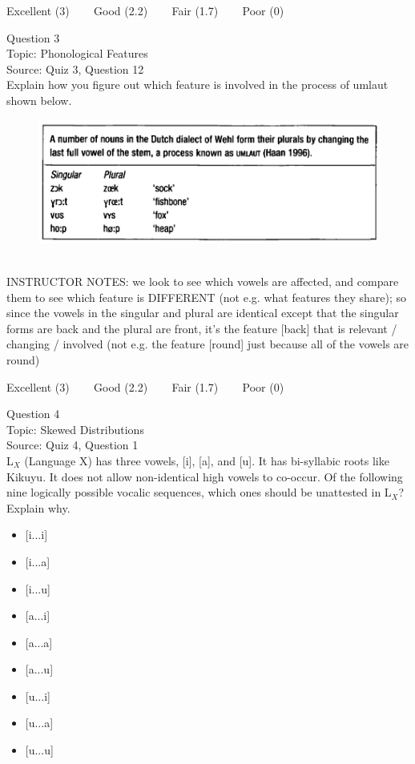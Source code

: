 \documentclass[12pt]{article}
\begin{document}
\vfill
Excellent (3) ~~~ Good (2.2) ~~~ Fair (1.7) ~~~ Poor (0)
\newpage

{\large Question 3}\\

Topic: Phonological Features\\
Source: Quiz 3, Question 12\\

Explain how you figure out which feature is involved in the process of umlaut shown below.\\

\begin{figure}[H]
\includegraphics{../images/dutch.png}
\end{figure}

~\\
INSTRUCTOR NOTES: we look to see which vowels are affected, and compare them to see which feature is DIFFERENT (not e.g. what features they share); so since the vowels in the singular and plural are identical except that the singular forms are back and the plural are front, it's the feature [back] that is relevant / changing / involved (not e.g. the feature [round] just because all of the vowels are round)


\vfill
Excellent (3) ~~~ Good (2.2) ~~~ Fair (1.7) ~~~ Poor (0)
\newpage

{\large Question 4}\\

Topic: Skewed Distributions\\
Source: Quiz 4, Question 1\\

L$_X$ (Language X) has three vowels, [i], [a], and [u]. It has bi-syllabic roots like Kikuyu. It does not allow non-identical high vowels to co-occur. Of the following nine logically possible vocalic sequences, which ones should be unattested in L$_X$? Explain why.\\

\begin{itemize} \item {[i...i]} \item {[i...a]} \item {[i...u]} \item {[a...i]} \item {[a...a]} \item {[a...u]} \item {[u...i]} \item {[u...a]} \item {[u...u]} \end{itemize}
\end{document}
